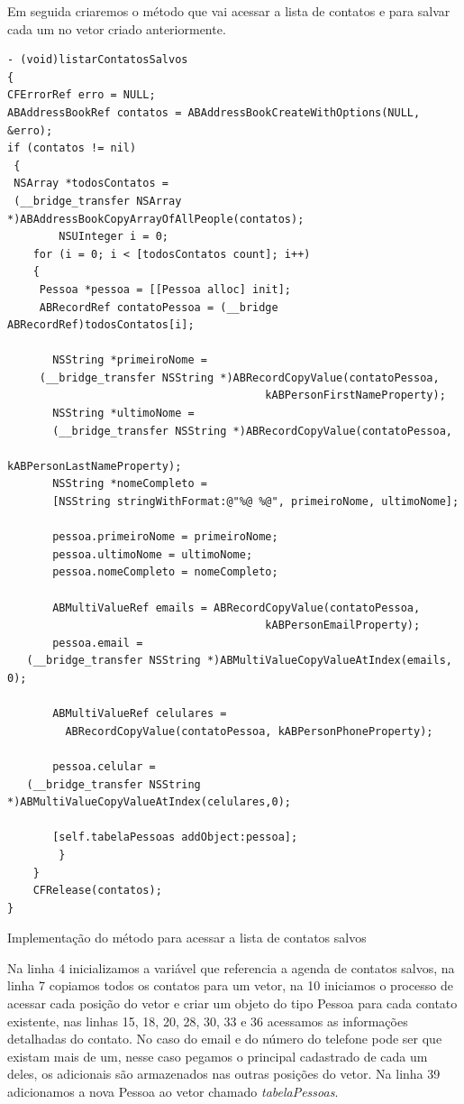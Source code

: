 \documentclass[a4paper,12pt,brazil,oneside]{book}
\begin{document}
Em seguida criaremos o método que vai acessar a lista de contatos e para salvar cada um no vetor criado anteriormente.

\begin{listing}[H]
\begin{verbatim}
- (void)listarContatosSalvos
{
CFErrorRef erro = NULL;
ABAddressBookRef contatos = ABAddressBookCreateWithOptions(NULL, &erro);
if (contatos != nil)
 {
 NSArray *todosContatos = 
 (__bridge_transfer NSArray *)ABAddressBookCopyArrayOfAllPeople(contatos);
        NSUInteger i = 0;
    for (i = 0; i < [todosContatos count]; i++)
    {
     Pessoa *pessoa = [[Pessoa alloc] init];
     ABRecordRef contatoPessoa = (__bridge ABRecordRef)todosContatos[i];
            
       NSString *primeiroNome = 
 	 (__bridge_transfer NSString *)ABRecordCopyValue(contatoPessoa, 
	      								kABPersonFirstNameProperty);
       NSString *ultimoNome =  
       (__bridge_transfer NSString *)ABRecordCopyValue(contatoPessoa, 
            								kABPersonLastNameProperty);
       NSString *nomeCompleto = 
       [NSString stringWithFormat:@"%@ %@", primeiroNome, ultimoNome];
            
       pessoa.primeiroNome = primeiroNome;
       pessoa.ultimoNome = ultimoNome;
       pessoa.nomeCompleto = nomeCompleto;
            
       ABMultiValueRef emails = ABRecordCopyValue(contatoPessoa, 
         								kABPersonEmailProperty);
       pessoa.email = 
   (__bridge_transfer NSString *)ABMultiValueCopyValueAtIndex(emails, 0);
            
       ABMultiValueRef celulares = 
      	 ABRecordCopyValue(contatoPessoa, kABPersonPhoneProperty);
			
       pessoa.celular = 
   (__bridge_transfer NSString *)ABMultiValueCopyValueAtIndex(celulares,0);
            
       [self.tabelaPessoas addObject:pessoa];   
        }
    }
    CFRelease(contatos);
}
\end{verbatim}
\caption{Implementação do método para acessar a lista de contatos salvos}
\end{listing}

Na linha 4 inicializamos a variável que referencia a agenda de contatos salvos, na linha 7 copiamos todos os contatos para um vetor, na 10 iniciamos o processo de acessar cada posição do vetor e criar um objeto do tipo Pessoa para cada contato existente, nas linhas 15, 18, 20, 28, 30, 33 e 36 acessamos as informações detalhadas do contato.
No caso do email e do número do telefone pode ser que existam mais de um, nesse caso pegamos o principal cadastrado de cada um deles, os adicionais são armazenados nas outras posições do vetor.
Na linha 39 adicionamos a nova Pessoa ao vetor chamado \emph{tabelaPessoas}.
\end{document}
